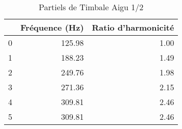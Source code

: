 \begin{table}
\centering
\caption{Partiels de Timbale Aigu 1/2}
\label{table:partiels-timbale-aigu-2.wav}
\begin{tabular}{lrr}
\toprule
{} &  Fréquence (Hz) &  Ratio d'harmonicité \\
\midrule
0 &          125.98 &                 1.00 \\
1 &          188.23 &                 1.49 \\
2 &          249.76 &                 1.98 \\
3 &          271.36 &                 2.15 \\
4 &          309.81 &                 2.46 \\
5 &          309.81 &                 2.46 \\
\bottomrule
\end{tabular}
\end{table}
